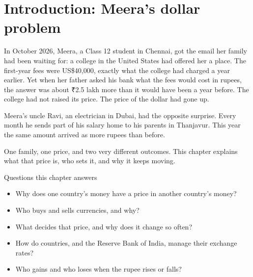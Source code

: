 \section*{Introduction: Meera's dollar problem}

In October 2026, Meera, a Class 12 student in Chennai, got the email her family had been waiting for: a college in the United States had offered her a place. The first-year fees were US\$40,000, exactly what the college had charged a year earlier. Yet when her father asked his bank what the fees would cost in rupees, the answer was about ₹2.5 lakh more than it would have been a year before. The college had not raised its price. The price of the dollar had gone up.

Meera's uncle Ravi, an electrician in Dubai, had the opposite surprise. Every month he sends part of his salary home to his parents in Thanjavur. This year the same amount arrived as more rupees than before.

One family, one price, and two very different outcomes. This chapter explains what that price is, who sets it, and why it keeps moving.

\begin{keypoints}{Questions this chapter answers}
\begin{itemize}
  \item Why does one country's money have a price in another country's money?
  \item Who buys and sells currencies, and why?
  \item What decides that price, and why does it change so often?
  \item How do countries, and the Reserve Bank of India, manage their exchange rates?
  \item Who gains and who loses when the rupee rises or falls?
\end{itemize}
\end{keypoints}
